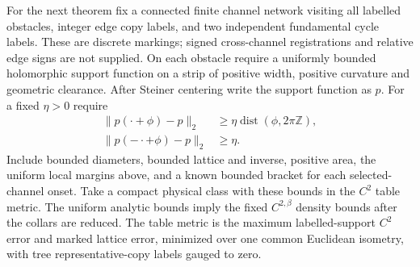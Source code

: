 For the next theorem fix a connected finite channel network visiting
all labelled obstacles, integer edge copy labels, and two independent
fundamental cycle labels. These are discrete markings; signed
cross-channel registrations and relative edge signs are not supplied.
On each obstacle require a uniformly bounded holomorphic support
function on a strip of positive width, positive curvature and geometric
clearance. After Steiner centering write the support function as $p$.
For a fixed $\eta>0$ require
\begin{align}
 \|p(\cdot+\phi)-p\|_2&\ge
             \eta\operatorname{dist}(\phi,2\pi\mathbb Z),
                                                   \label{eq:tw-rot}\\
 \|p(-\cdot+\phi)-p\|_2&\ge\eta.    \label{eq:tw-ref}
\end{align}
Include bounded diameters, bounded lattice and inverse, positive area,
the uniform local margins above, and a known bounded bracket for each
selected-channel onset. Take a compact physical class with these
bounds in the $C^2$ table metric. The uniform analytic bounds imply the
fixed $C^{2,\beta}$ density bounds after the collars are reduced.
The table metric is the maximum labelled-support $C^2$ error and marked
lattice error, minimized over one common Euclidean isometry, with tree
representative-copy labels gauged to zero.


